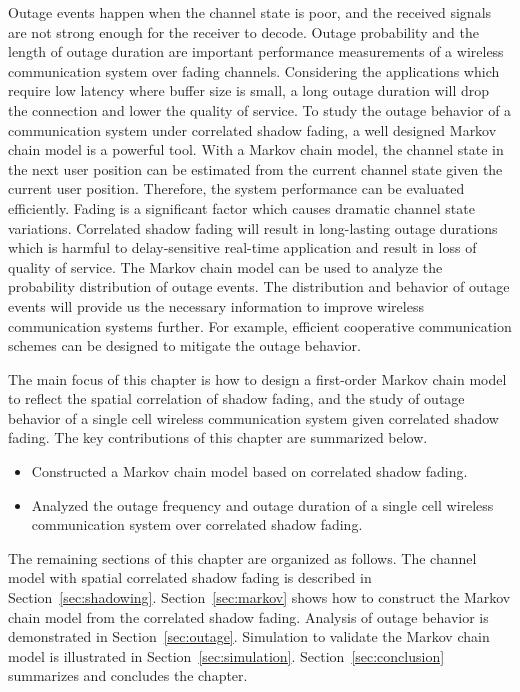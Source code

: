 \par Outage events happen when the channel state is poor, and the received signals are not strong enough for the receiver to decode. Outage probability and the length of outage duration are important performance measurements of a wireless communication system over fading channels. Considering the applications which require low latency where buffer size is small, a long outage duration will drop the connection and lower the quality of service. To study the outage behavior of a communication system under correlated shadow fading, a well designed Markov chain model is a powerful tool. With a Markov chain model, the channel state in the next user position can be estimated from the current channel state given the current user position. Therefore, the system performance can be evaluated efficiently. Fading is a significant factor which causes dramatic channel state variations. Correlated shadow fading will result in long-lasting outage durations which is harmful to delay-sensitive real-time application and result in loss of quality of service. The Markov chain model can be used to analyze the probability distribution of outage events. The distribution and behavior of outage events will provide us the necessary information to improve wireless communication systems further. For example, efficient cooperative communication schemes can be designed to mitigate the outage behavior.
\par The main focus of this chapter is how to design a first-order Markov chain model to reflect the spatial correlation of shadow fading, and the study of outage behavior of a single cell wireless communication system given correlated shadow fading. The key contributions of this chapter are summarized below.
\begin{itemize}
\item Constructed a Markov chain model based on correlated shadow fading.
\item Analyzed the outage frequency and outage duration of a single cell wireless communication system over correlated shadow fading.
\end{itemize}
 The remaining sections of this chapter are organized as follows. The channel model with spatial correlated shadow fading is described in Section~\ref{sec:shadowing}. Section~\ref{sec:markov} shows how to construct the Markov chain model from the correlated shadow fading. Analysis of outage behavior is demonstrated in Section~\ref{sec:outage}. Simulation to validate the Markov chain model is illustrated in Section~\ref{sec:simulation}. Section~\ref{sec:conclusion} summarizes and concludes the chapter.
